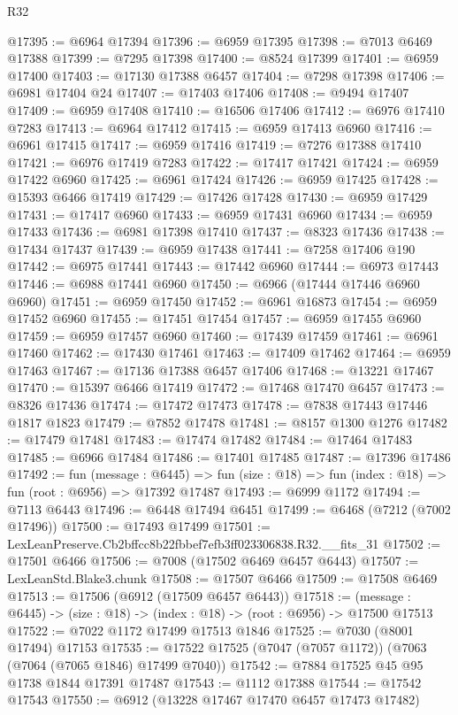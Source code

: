\begin{lexlean}{R32}
\begin{coremodule}
@17395 := @6964 @17394
@17396 := @6959 @17395
@17398 := @7013 @6469 @17388
@17399 := @7295 @17398
@17400 := @8524 @17399
@17401 := @6959 @17400
@17403 := @17130 @17388 @6457
@17404 := @7298 @17398
@17406 := @6981 @17404 @24
@17407 := @17403 @17406
@17408 := @9494 @17407
@17409 := @6959 @17408
@17410 := @16506 @17406
@17412 := @6976 @17410 @7283
@17413 := @6964 @17412
@17415 := @6959 @17413 @6960
@17416 := @6961 @17415
@17417 := @6959 @17416
@17419 := @7276 @17388 @17410
@17421 := @6976 @17419 @7283
@17422 := @17417 @17421
@17424 := @6959 @17422 @6960
@17425 := @6961 @17424
@17426 := @6959 @17425
@17428 := @15393 @6466 @17419
@17429 := @17426 @17428
@17430 := @6959 @17429
@17431 := @17417 @6960
@17433 := @6959 @17431 @6960
@17434 := @6959 @17433
@17436 := @6981 @17398 @17410
@17437 := @8323 @17436
@17438 := @17434 @17437
@17439 := @6959 @17438
@17441 := @7258 @17406 @190
@17442 := @6975 @17441
@17443 := @17442 @6960
@17444 := @6973 @17443
@17446 := @6988 @17441 @6960
@17450 := @6966 (@17444 @17446 @6960 @6960)
@17451 := @6959 @17450
@17452 := @6961 @16873
@17454 := @6959 @17452 @6960
@17455 := @17451 @17454
@17457 := @6959 @17455 @6960
@17459 := @6959 @17457 @6960
@17460 := @17439 @17459
@17461 := @6961 @17460
@17462 := @17430 @17461
@17463 := @17409 @17462
@17464 := @6959 @17463
@17467 := @17136 @17388 @6457 @17406
@17468 := @13221 @17467
@17470 := @15397 @6466 @17419
@17472 := @17468 @17470 @6457
@17473 := @8326 @17436
@17474 := @17472 @17473
@17478 := @7838 @17443 @17446 @1817 @1823
@17479 := @7852 @17478
@17481 := @8157 @1300 @1276
@17482 := @17479 @17481
@17483 := @17474 @17482
@17484 := @17464 @17483
@17485 := @6966 @17484
@17486 := @17401 @17485
@17487 := @17396 @17486
@17492 := fun (message : @6445) =>
  fun (size : @18) => fun (index : @18) => fun (root : @6956) => @17392 @17487
@17493 := @6999 @1172
@17494 := @7113 @6443
@17496 := @6448 @17494 @6451
@17499 := @6468 (@7212 (@7002 @17496))
@17500 := @17493 @17499
@17501 := LexLeanPreserve.Cb2bffcc8b22fbbef7efb3ff023306838.R32.__fits_31
@17502 := @17501 @6466
@17506 := @7008 (@17502 @6469 @6457 @6443)
@17507 := LexLeanStd.Blake3.chunk
@17508 := @17507 @6466
@17509 := @17508 @6469
@17513 := @17506 (@6912 (@17509 @6457 @6443))
@17518 := (message : @6445) -> (size : @18) -> (index : @18) -> (root : @6956) -> @17500 @17513
@17522 := @7022 @1172 @17499 @17513 @1846
@17525 := @7030 (@8001 @17494) @17153
@17535 := @17522 @17525 (@7047 (@7057 @1172)) (@7063 (@7064 (@7065 @1846) @17499 @7040))
@17542 := @7884 @17525 @45 @95 @1738 @1844 @17391 @17487
@17543 := @1112 @17388
@17544 := @17542 @17543
@17550 := @6912 (@13228 @17467 @17470 @6457 @17473 @17482)

\end{coremodule}
\end{lexlean}
